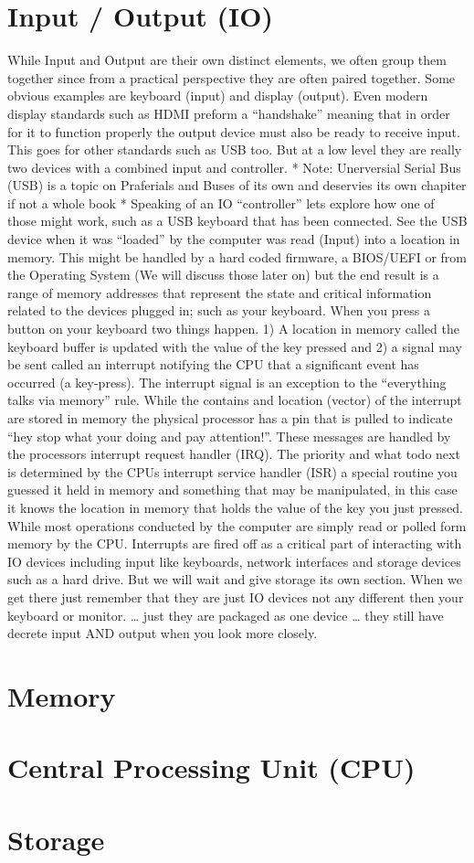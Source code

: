 \section{Input / Output (IO)}

While Input and Output are their own distinct elements, we often group them together since from a practical perspective they are often paired together. Some obvious examples are keyboard (input) and display (output). Even modern display standards such as HDMI preform a “handshake” meaning that in order for it to function properly the output device must also be ready to receive input. This goes for other standards such as USB too. But at a low level they are really two devices with a combined input and controller. 
* Note: Unerversial Serial Bus (USB) is a topic on Praferials and Buses of its own and deservies its own chapiter if not a whole book *
Speaking of an IO “controller” lets explore how one of those might work, such as a USB keyboard that has been connected. See the USB device when it was “loaded” by the computer was read (Input) into a location in memory. This might be handled by a hard coded firmware, a BIOS/UEFI or from the Operating System (We will discuss those later on) but the end result is a range of memory addresses that represent the state and critical information related to the devices plugged in; such as your keyboard. 
When you press a button on your keyboard two things happen. 1) A location in memory called the keyboard buffer is updated with the value of the key pressed and 2) a signal may be sent called an interrupt notifying the CPU that a significant event has occurred (a key-press). The interrupt signal is an exception to the “everything talks via memory” rule. While the contains and location (vector) of the interrupt are stored in memory the physical processor has a pin that is pulled to indicate “hey stop what your doing and pay attention!”. These messages are handled by the processors interrupt request handler (IRQ). The priority and what todo next is determined by the CPUs interrupt service handler (ISR) a special routine you guessed it held in memory and something that may be manipulated, in this case it knows the location in memory that holds the value of the key you just pressed.
While most operations conducted by the computer are simply read or polled form memory by the CPU. Interrupts are fired off as a critical part of interacting with IO devices including input like keyboards, network interfaces and storage devices such as a hard drive. But we will wait and give storage its own section. When we get there just remember that they are just IO devices not any different then your keyboard or monitor. … just they are packaged as one device … they still have decrete input AND output when you look more closely.

\section{Memory}

\section{Central Processing Unit (CPU)}

\section{Storage}
